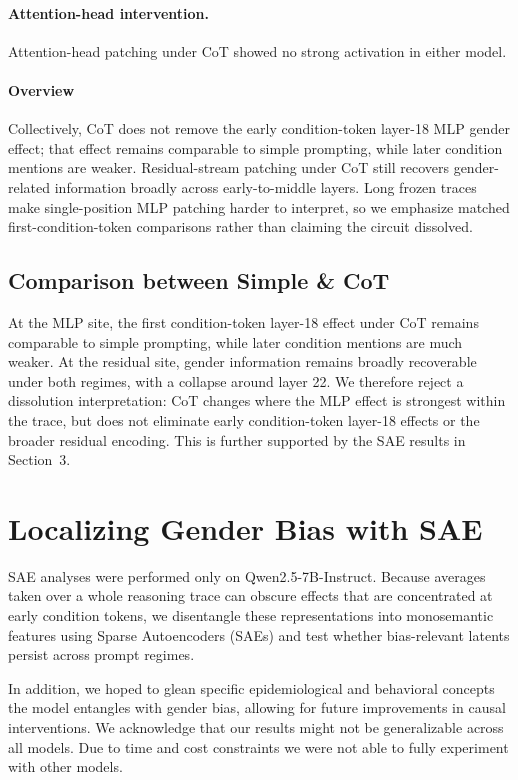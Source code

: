 \documentclass{article}
\begin{document}
\paragraph{Attention-head intervention.} Attention-head patching under CoT showed no strong activation in either model.

\paragraph{Overview}
Collectively, CoT does not remove the early condition-token layer-18 MLP gender effect; that effect remains comparable to simple prompting, while later condition mentions are weaker. Residual-stream patching under CoT still recovers gender-related information broadly across early-to-middle layers. Long frozen traces make single-position MLP patching harder to interpret, so we emphasize matched first-condition-token comparisons rather than claiming the circuit dissolved.

\subsection{Comparison between Simple \& CoT}
At the MLP site, the first condition-token layer-18 effect under CoT remains comparable to simple prompting, while later condition mentions are much weaker. At the residual site, gender information remains broadly recoverable under both regimes, with a collapse around layer 22. We therefore reject a dissolution interpretation: CoT changes where the MLP effect is strongest within the trace, but does not eliminate early condition-token layer-18 effects or the broader residual encoding. This is further supported by the SAE results in Section~3.

\section{Localizing Gender Bias with SAE}
SAE analyses were performed only on Qwen2.5-7B-Instruct. Because averages taken over a whole reasoning trace can obscure effects that are concentrated at early condition tokens, we disentangle these representations into monosemantic features using Sparse Autoencoders (SAEs) and test whether bias-relevant latents persist across prompt regimes.

In addition, we hoped to glean specific epidemiological and behavioral concepts the model entangles with gender bias, allowing for future improvements in causal interventions. We acknowledge that our results might not be generalizable across all models. Due to time and cost constraints we were not able to fully experiment with other models.
\end{document}
